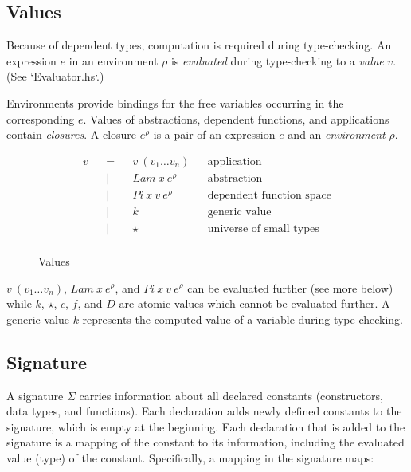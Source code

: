 \documentclass[acmsmall]{acmart}
\begin{document}
\subsection{Values}

Because of dependent types, computation is required during type-checking. An
expression $e$ in an environment $\rho$ is \textit{evaluated} during type-checking to a \textit{value} $v$. (See `Evaluator.hs`.)

Environments provide bindings for the free variables occurring in the
corresponding $e$. Values of abstractions, dependent functions, and applications contain \textit{closures}. A closure \textbf{$e^{\rho}$} is a pair of an expression $e$ and an
\textit{environment} \textbf{$\rho$}.

\begin{figure}[H]
  \begin{equation*}
    \label{eq:values}
    \begin{aligned}
      v &  & = &  & v \: (v_1 \dots v_n)     &  & \textrm{application}              \\
        &  & | &  & Lam \: x \: e^{\rho}     &  & \textrm{abstraction}              \\
        &  & | &  & Pi \: x \: v \: e^{\rho} &  & \textrm{dependent function space} \\
        &  & | &  & k                        &  & \textrm{generic value}            \\
        &  & | &  & \star                    &  & \textrm{universe of small types}  \\
    \end{aligned}
  \end{equation*}
  \caption{Values}
\end{figure}

$v \: (v_1 \dots v_n)$, $Lam \: x \: e^{\rho}$, and $Pi \: x \: v \: e^{\rho}$
can be evaluated further (see more below) while $k$, $\star$, $c$, $f$, and $D$ are atomic values
which cannot be evaluated further. A generic value $k$ represents the computed value of a variable during type
checking.

\subsection{Signature}
A signature $\Sigma$ carries information about all declared constants (constructors, data types, and functions). Each declaration adds newly defined constants to the signature, which is empty at the beginning. Each declaration that is added to the signature is a mapping of the constant to its information, including the evaluated value (type) of the constant. Specifically, a mapping in the signature maps:
\end{document}
